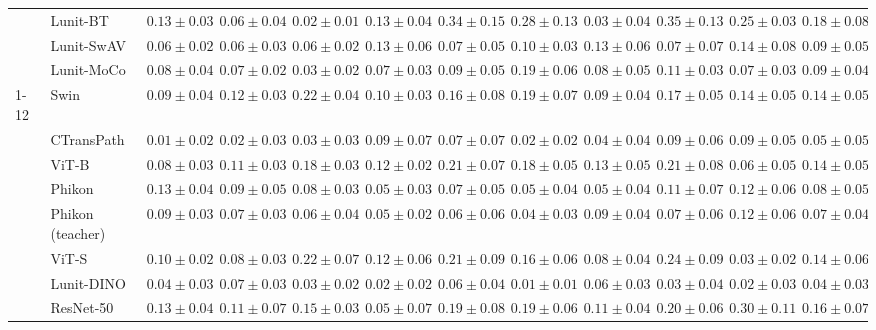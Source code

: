 \begin{tabular}{ll|cccc|c|cccc|c}
 & Lunit-BT & $0.13 \pm 0.03$ & $0.06 \pm 0.04$ & $0.02 \pm 0.01$ & $0.13 \pm 0.04$ & $0.34 \pm 0.15$ & $0.28 \pm 0.13$ & $0.03 \pm 0.04$ & $0.35 \pm 0.13$ & $0.25 \pm 0.03$ & $0.18 \pm 0.08$ \\
 & Lunit-SwAV & $0.06 \pm 0.02$ & $0.06 \pm 0.03$ & $0.06 \pm 0.02$ & $0.13 \pm 0.06$ & $0.07 \pm 0.05$ & $0.10 \pm 0.03$ & $0.13 \pm 0.06$ & $0.07 \pm 0.07$ & $0.14 \pm 0.08$ & $0.09 \pm 0.05$ \\
 & Lunit-MoCo & $0.08 \pm 0.04$ & $0.07 \pm 0.02$ & $0.03 \pm 0.02$ & $0.07 \pm 0.03$ & $0.09 \pm 0.05$ & $0.19 \pm 0.06$ & $0.08 \pm 0.05$ & $0.11 \pm 0.03$ & $0.07 \pm 0.03$ & $0.09 \pm 0.04$ \\
\cline{1-12}
\multirow[t]{12}{*}{Transformer} & Swin & $0.09 \pm 0.04$ & $0.12 \pm 0.03$ & $0.22 \pm 0.04$ & $0.10 \pm 0.03$ & $0.16 \pm 0.08$ & $0.19 \pm 0.07$ & $0.09 \pm 0.04$ & $0.17 \pm 0.05$ & $0.14 \pm 0.05$ & $0.14 \pm 0.05$ \\
 & CTransPath & $\mathbf{0.01 \pm 0.02}$ & $\mathbf{0.02 \pm 0.03}$ & $0.03 \pm 0.03$ & $0.09 \pm 0.07$ & $0.07 \pm 0.07$ & $0.02 \pm 0.02$ & $0.04 \pm 0.04$ & $0.09 \pm 0.06$ & $0.09 \pm 0.05$ & $0.05 \pm 0.05$ \\
 & ViT-B & $0.08 \pm 0.03$ & $0.11 \pm 0.03$ & $0.18 \pm 0.03$ & $0.12 \pm 0.02$ & $0.21 \pm 0.07$ & $0.18 \pm 0.05$ & $0.13 \pm 0.05$ & $0.21 \pm 0.08$ & $0.06 \pm 0.05$ & $0.14 \pm 0.05$ \\
 & Phikon & $0.13 \pm 0.04$ & $0.09 \pm 0.05$ & $0.08 \pm 0.03$ & $0.05 \pm 0.03$ & $0.07 \pm 0.05$ & $0.05 \pm 0.04$ & $0.05 \pm 0.04$ & $0.11 \pm 0.07$ & $0.12 \pm 0.06$ & $0.08 \pm 0.05$ \\
 & Phikon (teacher) & $0.09 \pm 0.03$ & $0.07 \pm 0.03$ & $0.06 \pm 0.04$ & $0.05 \pm 0.02$ & $0.06 \pm 0.06$ & $0.04 \pm 0.03$ & $0.09 \pm 0.04$ & $0.07 \pm 0.06$ & $0.12 \pm 0.06$ & $0.07 \pm 0.04$ \\
 & ViT-S & $0.10 \pm 0.02$ & $0.08 \pm 0.03$ & $0.22 \pm 0.07$ & $0.12 \pm 0.06$ & $0.21 \pm 0.09$ & $0.16 \pm 0.06$ & $0.08 \pm 0.04$ & $0.24 \pm 0.09$ & $0.03 \pm 0.02$ & $0.14 \pm 0.06$ \\
 & Lunit-DINO & $0.04 \pm 0.03$ & $0.07 \pm 0.03$ & $0.03 \pm 0.02$ & $\mathbf{0.02 \pm 0.02}$ & $\mathbf{0.06 \pm 0.04}$ & $\mathbf{0.01 \pm 0.01}$ & $0.06 \pm 0.03$ & $\mathbf{0.03 \pm 0.04}$ & $\mathbf{0.02 \pm 0.03}$ & $\mathbf{0.04 \pm 0.03}$ \\
 & ResNet-50 & $0.13 \pm 0.04$ & $0.11 \pm 0.07$ & $0.15 \pm 0.03$ & $0.05 \pm 0.07$ & $0.19 \pm 0.08$ & $0.19 \pm 0.06$ & $0.11 \pm 0.04$ & $0.20 \pm 0.06$ & $0.30 \pm 0.11$ & $0.16 \pm 0.07$ \\

\end{tabular}

